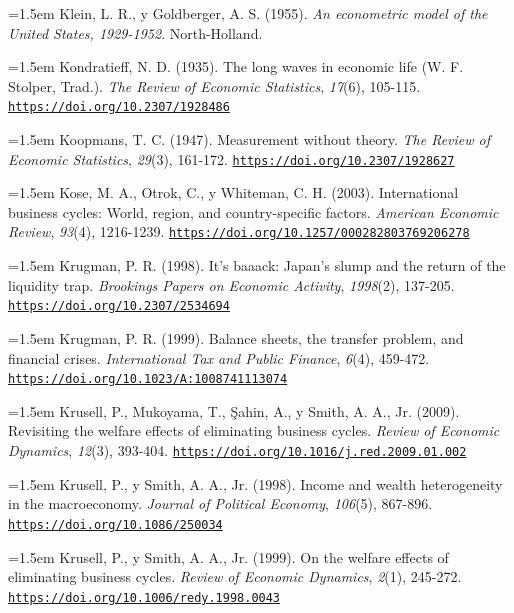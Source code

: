 \documentclass[10pt,a4paper]{article}
\begin{document}
\noindent\hangindent=1.5em Klein, L. R., y Goldberger, A. S. (1955). \textit{An econometric model of the United States, 1929-1952}. North-Holland.

\noindent\hangindent=1.5em Kondratieff, N. D. (1935). The long waves in economic life (W. F. Stolper, Trad.). \textit{The Review of Economic Statistics}, \textit{17}(6), 105-115. \href{https://doi.org/10.2307/1928486}{\nolinkurl{https://doi.org/10.2307/1928486}}

\noindent\hangindent=1.5em Koopmans, T. C. (1947). Measurement without theory. \textit{The Review of Economic Statistics}, \textit{29}(3), 161-172. \href{https://doi.org/10.2307/1928627}{\nolinkurl{https://doi.org/10.2307/1928627}}

\noindent\hangindent=1.5em Kose, M. A., Otrok, C., y Whiteman, C. H. (2003). International business cycles: World, region, and country-specific factors. \textit{American Economic Review}, \textit{93}(4), 1216-1239. \href{https://doi.org/10.1257/000282803769206278}{\nolinkurl{https://doi.org/10.1257/000282803769206278}}

\noindent\hangindent=1.5em Krugman, P. R. (1998). It's baaack: Japan's slump and the return of the liquidity trap. \textit{Brookings Papers on Economic Activity}, \textit{1998}(2), 137-205. \href{https://doi.org/10.2307/2534694}{\nolinkurl{https://doi.org/10.2307/2534694}}

\noindent\hangindent=1.5em Krugman, P. R. (1999). Balance sheets, the transfer problem, and financial crises. \textit{International Tax and Public Finance}, \textit{6}(4), 459-472. \href{https://doi.org/10.1023/A:1008741113074}{\nolinkurl{https://doi.org/10.1023/A:1008741113074}}

\noindent\hangindent=1.5em Krusell, P., Mukoyama, T., Şahin, A., y Smith, A. A., Jr. (2009). Revisiting the welfare effects of eliminating business cycles. \textit{Review of Economic Dynamics}, \textit{12}(3), 393-404. \href{https://doi.org/10.1016/j.red.2009.01.002}{\nolinkurl{https://doi.org/10.1016/j.red.2009.01.002}}

\noindent\hangindent=1.5em Krusell, P., y Smith, A. A., Jr. (1998). Income and wealth heterogeneity in the macroeconomy. \textit{Journal of Political Economy}, \textit{106}(5), 867-896. \href{https://doi.org/10.1086/250034}{\nolinkurl{https://doi.org/10.1086/250034}}

\noindent\hangindent=1.5em Krusell, P., y Smith, A. A., Jr. (1999). On the welfare effects of eliminating business cycles. \textit{Review of Economic Dynamics}, \textit{2}(1), 245-272. \href{https://doi.org/10.1006/redy.1998.0043}{\nolinkurl{https://doi.org/10.1006/redy.1998.0043}}
\end{document}
